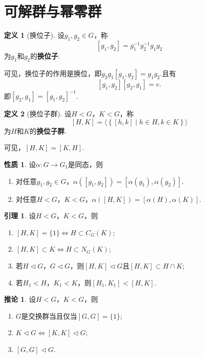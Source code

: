 \documentclass[12pt]{ctexart}
\theoremstyle{definition}
\newtheorem{definition}{定义}[section]
\newtheorem{lemma}{引理}[section]
\newtheorem{corollary}{推论}[section]
\newtheorem{property}{性质}[section]
\theoremstyle{plain}
\begin{document}
\section{可解群与幂零群}
\begin{definition}[换位子]
	设$g_1,g_2\in G$，称
	$$\left[g_1,g_2\right]=g_1^{-1}g_2^{-1}g_1g_2$$
	为$g_1$和$g_2$的\textbf{换位子}.
\end{definition}
可见，换位子的作用是换位，即$g_2g_1\left[g_1,g_2\right]=g_1g_2$.且有
$$\left[g_1,g_2\right]\left[g_2,g_1\right]=e.$$
即$\left[g_2,g_1\right]=\left[g_1,g_2\right]^{-1}$.
\begin{definition}[换位子群]
	设$H<G$，$K<G$，称
	$$\left[H,K\right]=\langle \left\{\left[h,k\right]\mid h\in H,k\in K\right\}\rangle$$
	为$H$和$K$的\textbf{换位子群}.
\end{definition}
可见，$\left[H,K\right]=\left[K,H\right]$.
\begin{property}
	设$\alpha:G\to G_1$是同态，则
	\begin{enumerate}
		\item 对任意$g_1,g_2\in G$，$\alpha\left(\left[g_1,g_2\right]\right)=\left[\alpha(g_1),\alpha(g_2)\right]$.
		\item 对任意$H<G$，$K<G$，$\alpha\left(\left[H,K\right]\right)=\left[\alpha(H),\alpha(K)\right]$.
	\end{enumerate}
\end{property}
\begin{lemma}
	设$H<G$，$K<G$，则
	\begin{enumerate}
		\item $\left[H,K\right]=\{1\}\iff H\subset C_G(K)$;
		\item $\left[H,K\right]\subset K\iff H\subset N_G(K)$;
		\item 若$H\lhd G$，$G\lhd G$，则$\left[H,K\right]\lhd G$且$\left[H,K\right]\subset H\cap K$;
		\item 若$H_1<H$，$K_1<K$，则$\left[H_1,K_1\right]<\left[H,K\right]$.
	\end{enumerate}
\end{lemma}
\begin{corollary}
	设$H<G$，$K<G$，则
	\begin{enumerate}
		\item $G$是交换群当且仅当$\left[G,G\right]=\{1\}$;
		\item $K\lhd G\iff \left[K,K\right]\lhd G$;
		\item $\left[G,G\right]\lhd G$.
	\end{enumerate}
\end{corollary}
\end{document}
